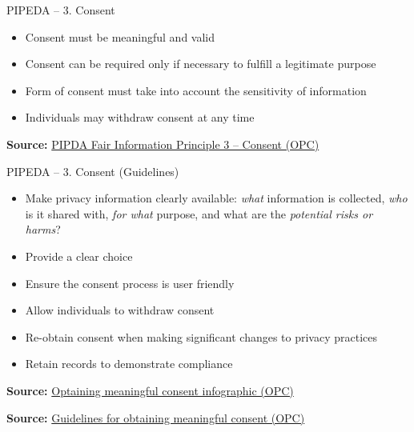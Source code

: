 \documentclass[ignorenonframetext,xcolor=x11names]{beamer}
\begin{document}
\begin{frame}[label=full]{PIPEDA -- 3. Consent}
\begin{itemize}
   \item Consent must be meaningful and valid
   \item Consent can be required only if necessary to fulfill a legitimate purpose
   \item Form of consent must take into account the sensitivity of information
   \item Individuals may withdraw consent at any time
\end{itemize}

\vspace{\baselineskip}
\scriptsize \textbf{Source:} \href{https://www.priv.gc.ca/en/privacy-topics/privacy-laws-in-canada/the-personal-information-protection-and-electronic-documents-act-pipeda/p_principle/principles/p_consent/}{PIPDA Fair Information Principle 3 -- Consent (OPC)}
\end{frame}

\begin{frame}[label=full]{PIPEDA -- 3. Consent \small (Guidelines)}
\begin{itemize}
   \item Make privacy information clearly available: \emph{what} information is collected, \emph{who} is it shared with, \emph{for what} purpose, and what are the \emph{potential risks or harms}?
   \item Provide a clear choice
   \item Ensure the consent process is user friendly
   \item Allow individuals to withdraw consent
   \item Re-obtain consent when making significant changes to privacy practices
   \item Retain records to demonstrate compliance
\end{itemize}

\vspace{\baselineskip}
\scriptsize \textbf{Source:} \href{https://www.priv.gc.ca/en/privacy-topics/collecting-personal-information/consent/info_mc/}{Optaining meaningful consent infographic (OPC)}

\vspace{\baselineskip}
\scriptsize \textbf{Source:} \href{https://www.priv.gc.ca/en/privacy-topics/collecting-personal-information/consent/gl_omc_201805/}{Guidelines for obtaining meaningful consent (OPC)}
\end{frame}
\end{document}
